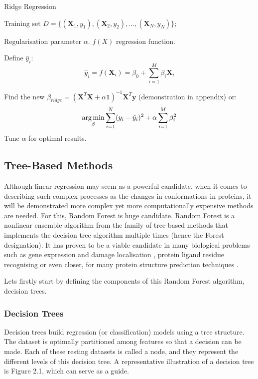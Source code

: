 \begin{algorithm}[H]
\caption{Ridge Regression}
\begin{algorithmic}[1]
    \Require Training set $D = \{ (\textbf{X}_1, y_1), (\textbf{X}_2, y_2), . . . , (\textbf{X}_N, y_N)\}$;
    
    Regularisation parameter $\alpha$.
    \Ensure $f(X)$ regression function.
    
    \State Define $\hat{y}_i$: \begin{equation}
        \hat{y}_i=f(\textbf{X}_i)=\beta_0+\sum_{i=1}^M\beta_i\textbf{X}_i
    \end{equation}
    
    \EndFor
    \State Find the new $\beta_{ridge}=(\textbf{X}^T\textbf{X} + \alpha \mathbb{1})^{-1}\textbf{X}^T\textbf{y}$ (demonstration in appendix) or: \begin{equation}
        \operatorname*{arg\,min}_{\beta}\sum_{i=1}^N(y_i-\hat{y}_i)^2+\alpha \sum_{i=1}^M\beta_i^2
    \end{equation}
    \State Tune $\alpha$ for optimal results.
\end{algorithmic}
\end{algorithm}
\subsection{Tree-Based Methods}
Although linear regression may seem as a powerful candidate, when it comes to describing such complex processes as the changes in conformations in proteins, it will be demonstrated more complex yet more computationally expensive methods are needed. For this, Random Forest is huge candidate. Random Forest is a nonlinear ensemble algorithm from the family of tree-based methods that implements the decision tree algorithm multiple times (hence the Forest designation). It has proven to be a viable candidate in many biological problems such as gene expression \cite{geneexpression} and damage localisation \cite{DNAdamage}, protein ligand residue recognising \cite{bindingresidues} or even closer, for many protein structure prediction techniques \cite{KALAISELVI2020107885}.

Lets firstly start by defining the components of this Random Forest algorithm, decision trees.
\subsubsection{Decision Trees}
Decision trees build regression (or classification) models using a tree structure. The dataset is optimally partitioned among features so that a decision can be made. Each of these resting datasets is called a node, and they represent the different levels of this decision tree. A representative illustration of a decision tree is Figure 2.1, which can serve as a guide.\\


